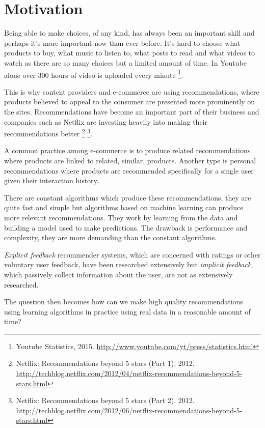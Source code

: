 
\section{Motivation}\label{sec:intro:motivation}

Being able to make choices, of any kind, has always been an important skill and perhaps it's more important now than ever before. It's hard to choose what products to buy, what music to listen to, what posts to read and what videos to watch as there are so many choices but a limited amount of time. In Youtube alone over 300 hours of video is uploaded every minute
\footnote{Youtube Statistics, 2015. \url{http://www.youtube.com/yt/press/statistics.html}}.

This is why content providers and e-commerce are using recommendations, where products believed to appeal to the consumer are presented more prominently on the sites. Recommendations have become an important part of their business and companies such as Netflix are investing heavily into making their recommendations better
\footnote{ Netflix: Recommendations beyond 5 stars (Part 1), 2012. \url{http://techblog.netflix.com/2012/04/netflix-recommendations-beyond-5-stars.html} }
\footnote{ Netflix: Recommendations beyond 5 stars (Part 2), 2012. \url{http://techblog.netflix.com/2012/06/netflix-recommendations-beyond-5-stars.html} }.

A common practice among e-commerce is to produce related recommendations where products are linked to related, similar, products. Another type is personal recommendations where products are recommended specifically for a single user given their interaction history.

There are constant algorithms which produce these recommendations, they are quite fast and simple but algorithms based on machine learning can produce more relevant recommendations. They work by learning from the data and building a model used to make predictions. The drawback is performance and complexity, they are more demanding than the constant algorithms.

\textit{Explicit feedback} recommender systems, which are concerned with ratings or other voluntary user feedback, have been researched extensively but \textit{implicit feedback}, which passively collect information about the user, are not as extensively researched. \citep{hu2008collaborative}


The question then becomes how can we make high quality recommendations using learning algorithms in practice using real data in a reasonable amount of time?

